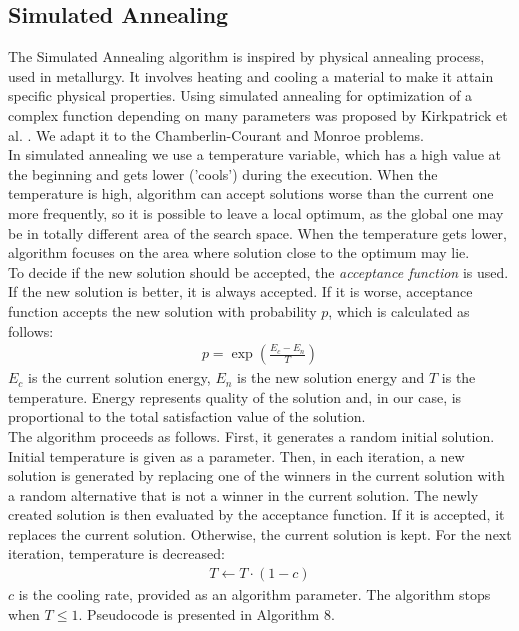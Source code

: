 \subsection{Simulated Annealing}

The Simulated Annealing algorithm is inspired by physical annealing process, used in metallurgy. It involves heating and cooling a material to make it attain specific physical properties. Using simulated annealing for optimization of a complex function depending on many parameters was proposed by Kirkpatrick et al. \cite{7}. We adapt it to the Chamberlin-Courant and Monroe problems.
\\

In simulated annealing we use a temperature variable, which has a high value at the beginning and gets lower ('cools') during the execution. When the temperature is high, algorithm can accept solutions worse than the current one more frequently, so it is possible to leave a local optimum, as the global one may be in totally different area of the search space. When the temperature gets lower, algorithm focuses on the area where solution close to the optimum may lie.
\\

To decide if the new solution should be accepted, the \textit{acceptance function} is used. If the new solution is better, it is always accepted. If it is worse, acceptance function accepts the new solution with probability $p$, which is calculated as follows:
\begin{gather}
	p = \exp(\frac{E_{c}-E_{n}}{T})
\end{gather}
$E_{c}$ is the current solution energy, $E_{n}$ is the new solution energy and $T$ is the temperature. Energy represents quality of the solution and, in our case, is proportional to the total satisfaction value of the solution.
\\

The algorithm proceeds as follows. First, it generates a random initial solution. Initial temperature is given as a parameter. Then, in each iteration, a new solution is generated by replacing one of the winners in the current solution with a random alternative that is not a winner in the current solution. The newly created solution is then evaluated by the acceptance function. If it is accepted, it replaces the current solution. Otherwise, the current solution is kept. For the next iteration, temperature is decreased:
\begin{gather}
	T \gets T \cdot (1 - c)
\end{gather}
$c$ is the cooling rate, provided as an algorithm parameter. The algorithm stops when $T \leq 1$. Pseudocode is presented in Algorithm 8.

